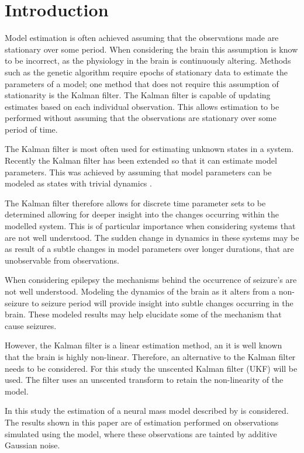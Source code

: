 
\section{Introduction}

Model estimation is often achieved assuming that the observations made are stationary over some period. When considering the brain this assumption is know to be incorrect, as the physiology in the brain is continuously altering. Methods such as the genetic algorithm require epochs of stationary data to estimate the parameters of a model; one method that does not require this assumption of stationarity is the Kalman filter. The Kalman filter is capable of updating estimates based on each individual observation. This allows estimation to be performed without assuming that the observations are stationary over some period of time.

The Kalman filter is most often used for estimating unknown states in a system. Recently the Kalman filter has been extended so that it can estimate model parameters. This was achieved by assuming that model parameters can be modeled as states with trivial dynamics . 

The Kalman filter therefore allows for discrete time parameter sets to be determined allowing for deeper insight into the changes occurring within the modelled system. This is of particular importance when considering systems that are not well understood. The sudden change in dynamics in these systems may be as result of a subtle changes in model parameters over longer durations, that are unobservable from observations.

When considering epilepsy the mechanisms behind the occurrence of seizure's are not well understood. Modeling the dynamics of the brain as it alters from a non-seizure to seizure period will provide insight into subtle changes occurring in the brain. These modeled results may help elucidate some of the mechanism that cause seizures.

However, the Kalman filter is a linear estimation method, an it is well known that the brain is highly non-linear. Therefore, an alternative to the Kalman filter needs to be considered. For this study the unscented Kalman filter (UKF) will be used. The filter uses an unscented transform to retain the non-linearity of the model.

In this study the estimation of a neural mass model described by  is considered. The results shown in this paper are of estimation performed on observations simulated using the model, where these observations are tainted by additive Gaussian noise. 

